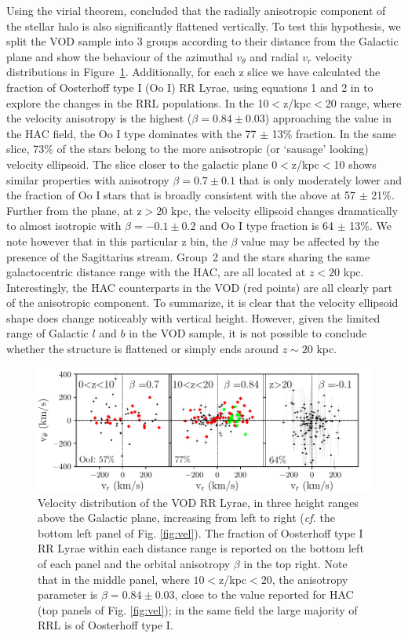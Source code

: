 \documentclass[fleqn,usenatbib]{mnras}
\begin{document}
Using the virial theorem, \citet{actionhalo} concluded that the
radially anisotropic component of the stellar halo is also
significantly flattened vertically. To test this hypothesis, we split
the VOD sample into 3 groups according to their distance from the
Galactic plane and show the behaviour of the azimuthal $v_{\theta}$
and radial $v_{r}$ velocity distributions in
Figure~\ref{fig:VOD_vel}. Additionally, for each z slice we have
calculated the fraction of Oosterhoff type I (Oo I) RR Lyrae, using
equations 1 and 2 in \citet{Be2018} to explore the changes in the RRL
populations. In the 10$<$z/kpc$<$20 range, where the velocity anisotropy
is the highest ($\beta = 0.84 \pm 0.03$) approaching the value in the
HAC field, the Oo I type dominates with the 77 $\pm$ 13\% fraction. In the same
slice, 73\% of the stars belong to the more anisotropic (or `sausage'
looking) velocity ellipsoid. The slice closer to the galactic plane 
0$<$z/kpc$<$10 shows similar properties with anisotropy $\beta
= 0.7 \pm 0.1$ that is only moderately lower and the fraction of Oo I stars
that is broadly consistent with the above at 57 $\pm$ 21\%. Further from
the plane, at z$>$20 kpc, the velocity ellipsoid changes dramatically
to almost isotropic with $\beta = -0.1 \pm 0.2$ and Oo I type fraction
is 64 $\pm$ 13\%. We note however that in this particular z bin, the
$\beta$ value may be affected by the presence of the Sagittarius
stream. Group~2 and the stars sharing the same galactocentric distance
range with the HAC, are all located at $z<20$ kpc. Interestingly, the
HAC counterparts in the VOD (red points) are all clearly part of the
anisotropic component. To summarize, it is clear that the velocity
ellipsoid shape does change noticeably with vertical height. However,
given the limited range of Galactic $l$ and $b$ in the VOD sample, it
is not possible to conclude whether the structure is flattened or
simply ends around $z\sim20$ kpc.
%   
%
\begin{figure}
	        \includegraphics[scale=0.55]{VOD_velocities_vphi_zcuts.pdf}
\vspace{-0.45cm}
   \caption{Velocity distribution of the VOD RR Lyrae, in three
     height ranges above the Galactic plane, increasing from left to
     right ({\it cf.} the bottom left panel of Fig.
     \ref{fig:vel}). The fraction of Oosterhoff type I RR Lyrae within
     each distance range is reported on the bottom left of each panel
     and the orbital anisotropy $\beta$ in the top right. Note that in
     the middle panel, where $10<$z/kpc$<20$, the anisotropy
     parameter is $\beta=0.84\pm0.03$, close to the value reported for
     HAC (top panels of Fig.  \ref{fig:vel}); in the same field the
     large majority of RRL is of Oosterhoff type I.}
    \label{fig:VOD_vel}
\end{figure}
%
\end{document}
